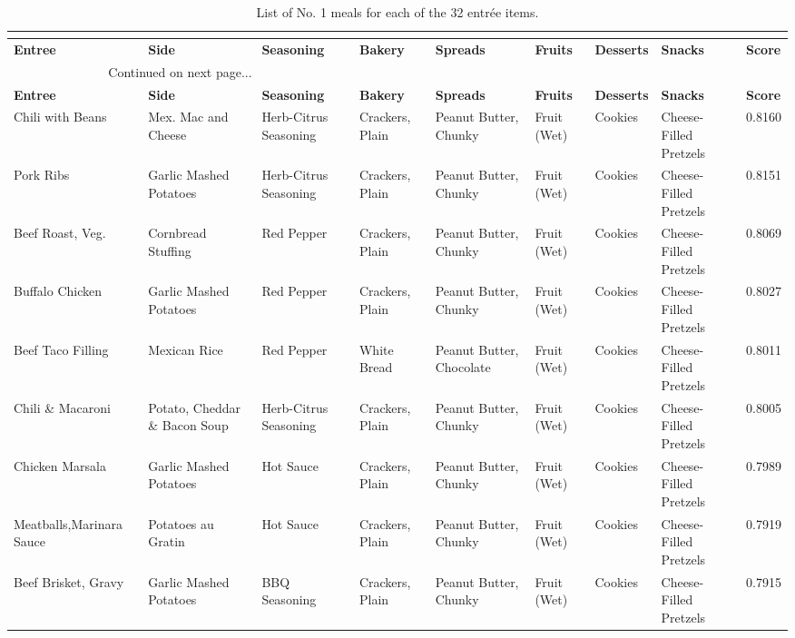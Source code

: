 \begin{landscape}
\footnotesize
\begin{longtable}{p{3.0cm}p{3.7cm}p{2.2cm}p{2.0cm}p{2.3cm}p{0.8cm}p{1.5cm}p{2.2cm}p{0.8cm}}
\caption{List of No. 1 meals for each of the 32 entrée items.  } \\
\label{tab:mremeals} \\
\endfirsthead
\midrule
{\bf Entree} & {\bf Side} & {\bf Seasoning} & {\bf Bakery} & {\bf Spreads} & {\bf Fruits} & {\bf Desserts} & {\bf Snacks} & {\bf Score}\\
\midrule
\endhead
 \multicolumn{3}{c}{Continued on next page...} \\
\endfoot
\bottomrule
\endlastfoot
\toprule
{\bf Entree} & {\bf Side} & {\bf Seasoning} & {\bf Bakery} & {\bf Spreads} & {\bf Fruits} & {\bf Desserts} & {\bf Snacks} & {\bf Score}\\
\midrule
Chili with Beans & Mex. Mac and Cheese & Herb-Citrus Seasoning & Crackers, Plain & Peanut Butter, Chunky & Fruit (Wet) & Cookies & Cheese-Filled Pretzels & 0.8160 \\
\midrule
Pork Ribs & Garlic Mashed Potatoes & Herb-Citrus Seasoning & Crackers, Plain & Peanut Butter, Chunky & Fruit (Wet) & Cookies & Cheese-Filled Pretzels & 0.8151 \\
\midrule
Beef Roast, Veg. & Cornbread Stuffing & Red Pepper & Crackers, Plain &  Peanut Butter, Chunky & Fruit (Wet) & Cookies & Cheese-Filled Pretzels & 0.8069 \\
\midrule
Buffalo Chicken & Garlic Mashed Potatoes & Red Pepper & Crackers, Plain &  Peanut Butter, Chunky & Fruit (Wet) & Cookies & Cheese-Filled Pretzels & 0.8027 \\
\midrule
Beef Taco Filling & Mexican Rice & Red Pepper & White Bread & Peanut Butter, Chocolate & Fruit (Wet) & Cookies & Cheese-Filled Pretzels & 0.8011 \\
\midrule
Chili \& Macaroni & Potato, Cheddar \& Bacon Soup & Herb-Citrus Seasoning & Crackers, Plain & Peanut Butter, Chunky & Fruit (Wet) & Cookies & Cheese-Filled Pretzels & 0.8005 \\
\midrule
Chicken Marsala & Garlic Mashed Potatoes & Hot Sauce & Crackers, Plain & Peanut Butter, Chunky & Fruit (Wet) & Cookies & Cheese-Filled Pretzels & 0.7989 \\
\midrule
Meatballs,Marinara Sauce & Potatoes au Gratin & Hot Sauce & Crackers, Plain & Peanut Butter, Chunky & Fruit (Wet) & Cookies & Cheese-Filled Pretzels & 0.7919 \\
\midrule
Beef Brisket, Gravy & Garlic Mashed Potatoes & BBQ Seasoning & Crackers, Plain & Peanut Butter, Chunky & Fruit (Wet) & Cookies & Cheese-Filled Pretzels & 0.7915 \\

\end{longtable}
\end{landscape}
